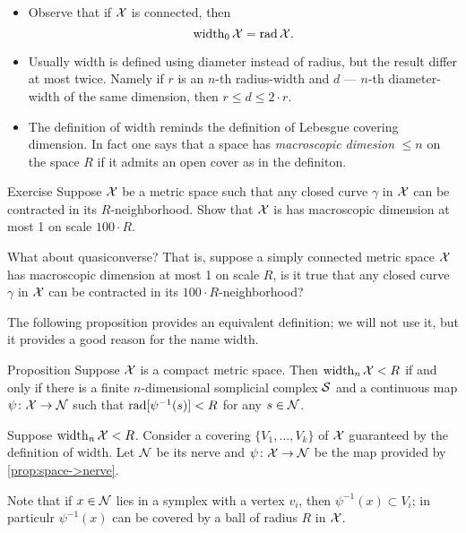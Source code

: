 \begin{itemize}
\item Observe that if $\mathcal{X}$ is connected, then 
\[\operatorname{\rm width}\nolimits_0\mathcal{X}=\mathop{\rm rad}\nolimits\mathcal{X}.\]
\item 
Usually width is defined using diameter instead of radius, but the result differ at most twice.
Namely if $r$ is an $n$-th radius-width and $d$ --- $n$-th diameter-width of the same dimension, then 
$r\le d\le 2\cdot r$.

\item The definition of width reminds the definition of Lebesgue covering dimension.
In fact one says that a space has \emph{macroscopic dimesion} $\le n$ on the space $R$ if it admits an open cover as in the definiton.
\end{itemize}

\begin{thm}{Exercise}\label{ex:macrodimension}
Suppose $\mathcal{X}$ be a metric space such that any closed curve $\gamma$ in $\mathcal{X}$ can be contracted in its $R$-neighborhood.
Show that $\mathcal{X}$ is has macroscopic dimension at most 1 on scale $100\cdot R$.

What about quasiconverse? That is, suppose a simply connected metric space $\mathcal{X}$ has macroscopic dimension at most 1 on scale $R$, is it true that any closed curve $\gamma$ in $\mathcal{X}$ can be contracted in its $100\cdot R$-neighborhood?
\end{thm}


The following proposition provides an equivalent definition;
we will not use it, but it provides a good reason for the name width.

\begin{thm}{Proposition}\label{prop:width=suprad(inv)}
Suppose $\mathcal{X}$ is a compact metric space.
Then $\operatorname{\rm width}\nolimits_n\mathcal{X}<R$ if and only if there is a finite $n$-dimensional somplicial complex $\mathcal{S}$ and a continuous map $\psi\colon\mathcal{X}\to \mathcal{N}$
such that $\rad[\psi^{-1}(s)]\z<R$
for any $s\in \mathcal{N}$.
\end{thm}

Suppose $\operatorname{\rm width}\nolimits_n\mathcal{X}<R$.
Consider a covering $\{V_1,\dots,V_k\}$ of $\mathcal{X}$ guaranteed by the definition of width.
Let $\mathcal{N}$ be its nerve and $\psi\colon\mathcal{X}\to \mathcal{N}$ be the map provided by \ref{prop:space->nerve}.

Note that if $x\in \mathcal{N}$ lies in a symplex with a vertex $v_i$,
then $\psi^{-1}(x)\subset V_i$;
in particulr $\psi^{-1}(x)$ can be covered by a ball of radius $R$ in $\mathcal{X}$.

